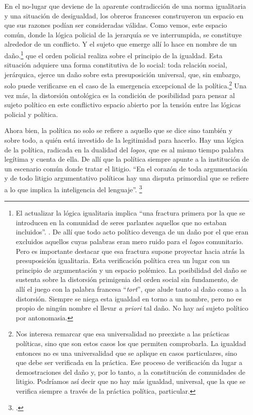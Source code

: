 En el no-lugar que deviene de la aparente contradicción de una norma igualitaria y una situación de desigualdad, los obreros franceses construyeron un espacio en que sus razones podían ser consideradas válidas. Como vemos, este espacio común, donde la lógica policial de la jerarquía se ve interrumpida, se constituye alrededor de un conflicto. Y el sujeto que emerge allí lo hace en nombre de un daño.\footnote{El actualizar la lógica igualitaria implica \enquote{una fractura primera por la que se introducen en la comunidad de seres parlantes aquellos que no estaban incluidos}. \cite[][67]{@7065-RANCIERE2007}. De allí que todo acto político devenga de un daño por el que eran excluidos aquellos cuyas palabras eran mero ruido para el \emph{logos} comunitario. Pero es importante destacar que esa fractura supone proyectar hacia atrás la presuposición igualitaria. Esta verificación política crea un lugar con un principio de argumentación y un espacio polémico. La posibilidad del daño se sustenta sobre la distorsión primigenia del orden social sin fundamento, de allí el juego con la palabra francesa \enquote{\emph{tort}}, que alude tanto al daño como a la distorsión. Siempre se niega esta igualdad en torno a un nombre, pero no es propio de ningún nombre el llevar \emph{a priori} tal daño. No hay así sujeto político por antonomasia.} que el orden policial realiza sobre el principio de la igualdad. Esta situación adquiere una forma constitutiva de lo social: toda relación social, jerárquica, ejerce un daño sobre esta presuposición universal, que, sin embargo, solo puede verificarse en el caso  de la emergencia excepcional de la política.\footnote{Nos interesa remarcar que esa universalidad no preexiste a las prácticas políticas, sino que son estos casos los que permiten comprobarla. La igualdad entonces no es una universalidad que se aplique en casos particulares, sino que debe ser verificada en la práctica. Ese proceso de verificación da lugar a demostraciones del daño y, por lo tanto, a la constitución de comunidades de litigio. Podríamos así decir que no hay más igualdad, universal, que la que se verifica siempre a través de la práctica política, particular.} Una vez más, la distorsión ontológica es la condición de posibilidad para pensar al sujeto político en este conflictivo espacio abierto por la tensión entre las lógicas policial y política.

Ahora bien, la política no solo se refiere a aquello que se dice sino también y sobre todo, a quién está investido de la legitimidad para hacerlo. Hay una lógica de la política, radicada en la dualidad del \emph{logos}, que es al mismo tiempo palabra legítima y cuenta de ella. De allí que la política siempre apunte a la institución de un escenario común donde tratar el litigio. \enquote{En el corazón de toda argumentación y de todo litigio argumentativo políticos hay una disputa primordial que se refiere a lo que implica la inteligencia del lenguaje}. \footcite[][68]{@7064-RANCIERE2010}

